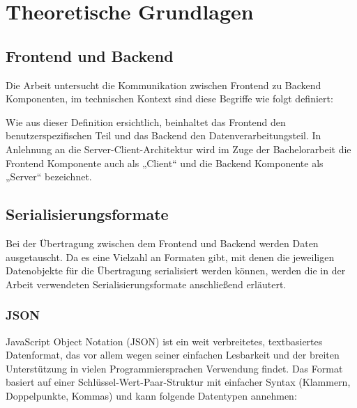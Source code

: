 \chapter{Theoretische Grundlagen}
\label{chap:intro}
\chapterstart

\section{Frontend und Backend}

Die Arbeit untersucht die Kommunikation zwischen Frontend zu Backend Komponenten, im technischen Kontext sind diese Begriffe wie folgt definiert:

{\cite{awsfrontendbackend}}

Wie aus dieser Definition ersichtlich, beinhaltet das Frontend den benutzerspezifischen Teil und das Backend den Datenverarbeitungsteil. In Anlehnung an die Server-Client-Architektur wird im Zuge der Bachelorarbeit die Frontend Komponente auch als „Client“ und die Backend Komponente als „Server“ bezeichnet.

\section{Serialisierungsformate}
Bei der Übertragung zwischen dem Frontend und Backend werden Daten ausgetauscht. Da es eine Vielzahl an Formaten gibt, mit denen die jeweiligen Datenobjekte für die Übertragung serialisiert werden können, werden die in der Arbeit verwendeten Serialisierungsformate anschließend erläutert.

\subsection{JSON}
JavaScript Object Notation (JSON) ist ein weit verbreitetes, textbasiertes Datenformat, das vor allem wegen seiner einfachen Lesbarkeit und der breiten Unterstützung in vielen Programmiersprachen Verwendung findet. 
Das Format basiert auf einer Schlüssel-Wert-Paar-Struktur mit einfacher Syntax (Klammern, Doppelpunkte, Kommas) und kann folgende Datentypen annehmen:



